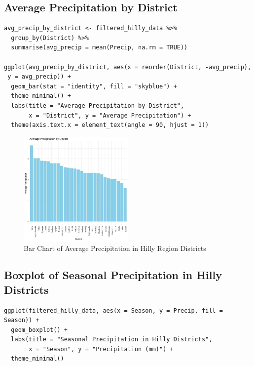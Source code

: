 \subsection*{Average Precipitation by District}

\begin{verbatim}
avg_precip_by_district <- filtered_hilly_data %>%
  group_by(District) %>%
  summarise(avg_precip = mean(Precip, na.rm = TRUE))

ggplot(avg_precip_by_district, aes(x = reorder(District, -avg_precip),
 y = avg_precip)) +
  geom_bar(stat = "identity", fill = "skyblue") +
  theme_minimal() +
  labs(title = "Average Precipitation by District",
       x = "District", y = "Average Precipitation") +
  theme(axis.text.x = element_text(angle = 90, hjust = 1))
\end{verbatim}

\begin{figure}[h]
    \centering
    \includegraphics[width=0.5\textwidth]{figures/bar_hilly.jpg}
    \caption{Bar Chart of Average Precipitation in Hilly Region Districts}
\end{figure}

\subsection*{Boxplot of Seasonal Precipitation in Hilly Districts}

\begin{verbatim}
ggplot(filtered_hilly_data, aes(x = Season, y = Precip, fill = Season)) +
  geom_boxplot() +
  labs(title = "Seasonal Precipitation in Hilly Districts",
       x = "Season", y = "Precipitation (mm)") +
  theme_minimal()
\end{verbatim}

